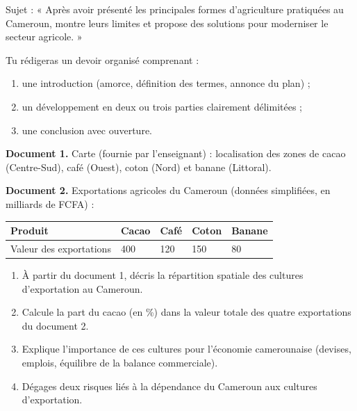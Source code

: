 \documentclass[11pt]{article}
\newcounter{popsec}
\newcounter{popsub}
\newcommand{\courssub}[1]{%
  \stepcounter{popsub}%
  \par\vspace{9pt}\noindent{\popxbold\fontsize{11.5}{13}\selectfont\color{popink}{\color{poporange}\thepopsec.\thepopsub}\hspace{6pt}#1}\par\nopagebreak\vspace{4pt}
}
\begin{document}
\courssub{Je me prépare au Bac}

\begin{exercice}
Sujet : « Après avoir présenté les principales formes d'agriculture pratiquées au Cameroun, montre leurs limites et propose des solutions pour moderniser le secteur agricole. »

Tu rédigeras un devoir organisé comprenant :
\begin{enumerate}
\item une introduction (amorce, définition des termes, annonce du plan) ;
\item un développement en deux ou trois parties clairement délimitées ;
\item une conclusion avec ouverture.
\end{enumerate}
\end{exercice}

\begin{exercice}
\textbf{Document 1.} Carte (fournie par l'enseignant) : localisation des zones de cacao (Centre-Sud), café (Ouest), coton (Nord) et banane (Littoral).

\textbf{Document 2.} Exportations agricoles du Cameroun (données simplifiées, en milliards de FCFA) :
\begin{center}
\begin{tabularx}{\linewidth}{|l|X|X|X|X|}
\hline
\rowcolor{popblueL} Produit & Cacao & Café & Coton & Banane \\
\hline
Valeur des exportations & 400 & 120 & 150 & 80 \\
\hline
\end{tabularx}
\end{center}
\begin{enumerate}
\item À partir du document 1, décris la répartition spatiale des cultures d'exportation au Cameroun.
\item Calcule la part du cacao (en \%) dans la valeur totale des quatre exportations du document 2.
\item Explique l'importance de ces cultures pour l'économie camerounaise (devises, emplois, équilibre de la balance commerciale).
\item Dégages deux risques liés à la dépendance du Cameroun aux cultures d'exportation.
\end{enumerate}
\end{exercice}
\end{document}
